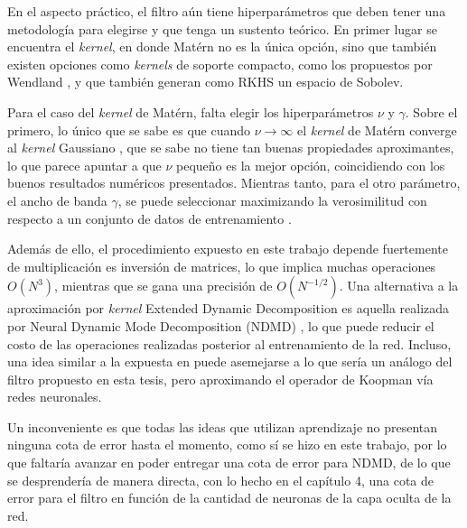 En el aspecto práctico, el filtro aún tiene hiperparámetros que deben tener una metodología para elegirse y que tenga un sustento teórico. En primer lugar se encuentra el \textit{kernel}, en donde Matérn no es la única opción, sino que también existen opciones como \textit{kernels} de soporte compacto, como los propuestos por Wendland \cite{Wendland1995PiecewiseDegree}, y que también generan como RKHS un espacio de Sobolev.

Para el caso del \textit{kernel} de Matérn, falta elegir los hiperparámetros $\nu$ y $\gamma$. Sobre el primero, lo único que se sabe es que cuando $\nu \to \infty$ el \textit{kernel} de Matérn converge al \textit{kernel} Gaussiano \cite{Rasmussen2005GaussianLearning}, que se sabe no tiene tan buenas propiedades aproximantes, lo que parece apuntar a que $\nu$ pequeño es la mejor opción, coincidiendo con los buenos resultados numéricos presentados. Mientras tanto, para el otro parámetro, el ancho de banda $\gamma$, se puede seleccionar maximizando la verosimilitud con respecto a un conjunto de datos de entrenamiento \cite{Rasmussen2005GaussianLearning}.

Además de ello, el procedimiento expuesto en este trabajo depende fuertemente de multiplicación es inversión de matrices, lo que implica muchas operaciones $O(N^3)$, mientras que se gana una precisión de $O(N^{-1/2})$. Una alternativa a la aproximación por \textit{kernel} Extended Dynamic Decomposition es aquella realizada por Neural Dynamic Mode Decomposition (NDMD) \cite{Xiong2024KoopmanEquations, Frion2023LeveragingData, Terao2021ExtendedEquations}, lo que puede reducir el costo de las operaciones realizadas posterior al entrenamiento de la red. Incluso, una idea similar a la expuesta en \cite{Li2022Data-DrivenNetworks, Liu2024NeuralSystems, Garmaev2024DeepModelling} puede asemejarse a lo que sería un análogo del filtro propuesto en esta tesis, pero aproximando el operador de Koopman vía redes neuronales. 

Un inconveniente es que todas las ideas que utilizan aprendizaje no presentan ninguna cota de error hasta el momento, como sí se hizo en este trabajo, por lo que faltaría avanzar en poder entregar una cota de error para NDMD, de lo que se desprendería de manera directa, con lo hecho en el capítulo 4, una cota de error para el filtro en función de la cantidad de neuronas de la capa oculta de la red.